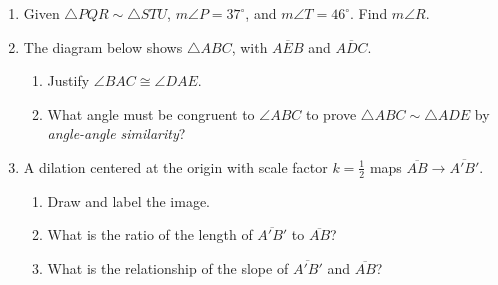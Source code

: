 \documentclass[12pt, twoside]{article}
\begin{document}
\begin{enumerate}
\item Given $\triangle PQR \sim \triangle STU$, $m\angle P=37^\circ$, and $m\angle T=46^\circ$. Find $m\angle R$. \vspace{3cm}

\item The diagram below shows $\triangle ABC$, with $\overline{AEB}$ and $\overline{ADC}$.
    \begin{multicols}{2}
      \begin{enumerate}
    \item Justify $\angle BAC \cong \angle DAE$.
    \item What angle must be congruent to $\angle ABC$ to prove $\triangle ABC \sim \triangle ADE$ by \emph{angle-angle similarity}? \vspace{3cm}
    \end{enumerate}
    \end{multicols}

\newpage
\item A dilation centered at the origin with scale factor $k=\frac{1}{2}$ maps $\overline{AB} \rightarrow \overline{A'B'}$. 
\begin{multicols}{2}
\begin{enumerate}
  \item Draw and label the image.
  \item What is the ratio of the length of $\overline{A'B'}$ to $\overline{AB}$?
  \item What is the relationship of the slope of $\overline{A'B'}$ and $\overline{AB}$?
  \begin{flushright}
  \end{flushright}
\end{enumerate}
\end{multicols} \vspace{1cm}


\end{enumerate}
\end{document}
